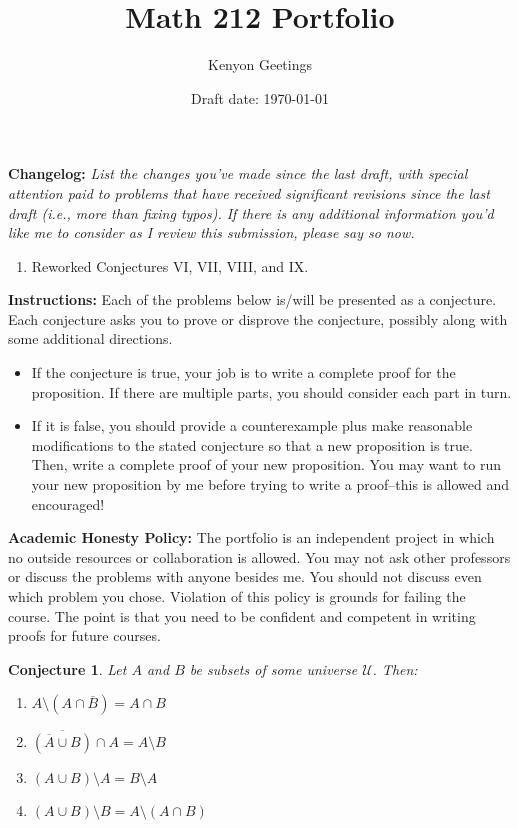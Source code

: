 \documentclass[11pt,titlepage]{article}		%
\title{\sc Math 212 Portfolio}
\author{Kenyon Geetings}
\date{Draft date: \today}
\newtheorem{conjecture}[theorem]{Conjecture}
\theoremstyle{definition}
\theoremstyle{theorem}
\begin{document}
\maketitle


\noindent\textbf{Changelog:} \emph{List the changes you've made since the last draft, with special attention paid to problems that have received significant revisions since the last draft (i.e., more than fixing typos). If there is any additional information you'd like me to consider as I review this submission, please say so now.}
\begin{enumerate}
    \item Reworked Conjectures VI, VII, VIII, and IX.

\end{enumerate}
\noindent\textbf{Instructions:} Each of the problems below is/will be presented as a conjecture. Each conjecture asks you to prove or disprove the conjecture, possibly along with some additional directions. 

\bigskip

\begin{itemize}  
	\item If the conjecture is true, your job is to write a complete proof for the proposition. If there are multiple parts, you should consider each part in turn.
	\item If it is false, you should provide a counterexample plus make reasonable modifications to the stated conjecture so that a new proposition is true. Then, write a complete proof of your new proposition. You may want to run your new proposition by me before trying to write a proof--this is allowed and encouraged!
\end{itemize}


\noindent\textbf{Academic Honesty Policy:}
The portfolio is an independent project in which no outside resources or collaboration is allowed. You may not ask other professors or discuss the problems with anyone besides me. You should not discuss even which problem you chose. Violation of this policy is grounds for failing the course. The point is that you need to be confident and competent in writing proofs for future courses.






\clearpage

\begin{conjecture}
	Let $A$ and $B$ be subsets of some universe $\mathcal{U}$.
	Then:
	\begin{enumerate}
		\item $A\setminus (A\cap \overline{B}) = A\cap B$
		\item $\overline{(\overline{A}\cup B)} \cap A = A\setminus B$
		\item $(A\cup B)\setminus A = B\setminus A$
		\item $(A\cup B) \setminus B = A\setminus (A\cap B)$
	\end{enumerate}
\end{conjecture}
\end{document}
